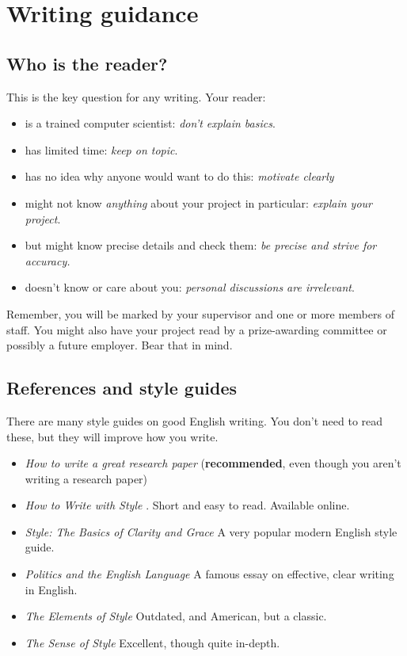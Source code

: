 \documentclass{l4proj}
\begin{document}
\section{Writing guidance}
\subsection{Who is the reader?}

This is the key question for any writing. Your reader:

\begin{itemize}
    \item
    is a trained computer scientist: \emph{don't explain basics}.
    \item
    has limited time: \emph{keep on topic}.
    \item
    has no idea why anyone would want to do this: \emph{motivate clearly}
    \item
    might not know \emph{anything} about your project in particular:
    \emph{explain your project}.
    \item
    but might know precise details and check them: \emph{be precise and
    strive for accuracy.}
    \item
    doesn't know or care about you: \emph{personal discussions are
    irrelevant}.
\end{itemize}

Remember, you will be marked by your supervisor and one or more members
of staff. You might also have your project read by a prize-awarding
committee or possibly a future employer. Bear that in mind.

\subsection{References and style guides}
There are many style guides on good English writing. You don't need to
read these, but they will improve how you write.

\begin{itemize}
    \item
    \emph{How to write a great research paper} \cite{Pey17} (\textbf{recommended}, even though you aren't writing a research paper)
    \item
    \emph{How to Write with Style} \cite{Von80}. Short and easy to read. Available online.
    \item
    \emph{Style: The Basics of Clarity and Grace} \cite{Wil09} A very popular modern English style guide.
    \item
    \emph{Politics and the English Language} \cite{Orw68}  A famous essay on effective, clear writing in English.
    \item
    \emph{The Elements of Style} \cite{StrWhi07} Outdated, and American, but a classic.
    \item
    \emph{The Sense of Style} \cite{Pin15} Excellent, though quite in-depth.
\end{itemize}
\end{document}
